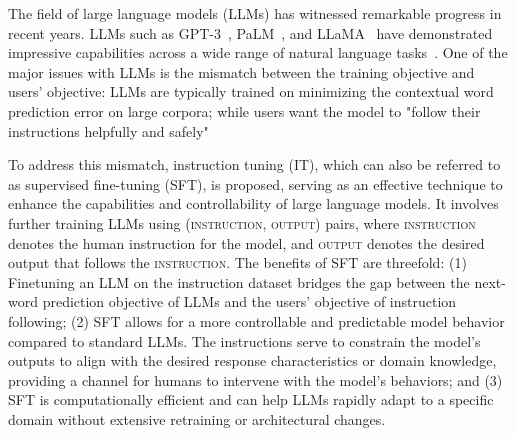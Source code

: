 \documentclass[11pt]{article}
\begin{document}
The field of large language models (LLMs) has witnessed remarkable progress in recent years. LLMs such as GPT-3~\citep{Brown2020LanguageMA}, PaLM~\citep{Chowdhery2022PaLMSL}, and LLaMA~\citep{Touvron2023LLaMAOA} have demonstrated impressive capabilities across a wide range of natural language tasks~\citep{Zhao2021CalibrateBU, Wang2022SelfConsistencyIC, wang2023gpt, wan2023gpt, sun2023text, wei2023zero, Li2023EvaluatingCI, Gao2023ExploringTF, Yao2023TreeOT, yang2022re3, qian2022controllable,  Lee2022CoAuthorDA, Yang2022TailorAP, gao2023enabling, Ning2023AlbumSW, liu2021makes, wiegreffe2021reframing, sun2023pushing, Sun2023AnsweringAQ, Adlakha2023EvaluatingCA, Chen2023DistinguishBA}. 
One of the major issues with LLMs is the mismatch between the training objective and users' objective: 
LLMs are typically trained on minimizing 
the
contextual word prediction error on large corpora;
while users want  the model to  "follow their instructions helpfully and safely"~\citep{radford2019language, brown2020language, Fedus2021SwitchTS, rae2021scaling, thoppilan2022lamda}

 



To address this mismatch, instruction tuning (IT), which can also be referred to as supervised fine-tuning (SFT), is proposed, serving as an
 effective technique to enhance the capabilities and controllability of large language models. It involves further training LLMs using 
\textsc{(instruction, output)} pairs, where  \textsc{instruction} denotes the human instruction for the model, and  \textsc{output} denotes the desired output that follows the \textsc{instruction}. 
The benefits of SFT are threefold: 
(1) Finetuning an LLM on the instruction dataset bridges the gap between the next-word prediction objective of LLMs and  the users' objective of instruction following; 
(2) SFT allows for a more controllable and predictable model behavior compared to standard LLMs. The instructions serve to constrain the model's outputs to align with the desired response characteristics or domain knowledge, providing a channel for humans to intervene with the model's behaviors; and
(3) SFT is computationally efficient and can help LLMs rapidly adapt  to a specific domain without extensive retraining or architectural changes.
\end{document}
